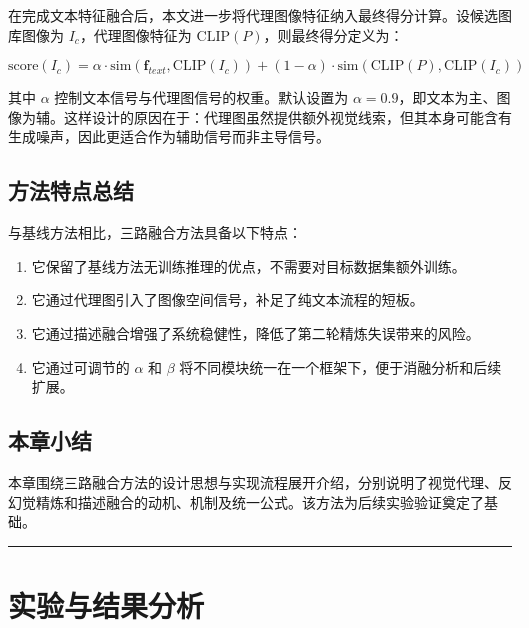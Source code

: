 \documentclass[12pt,a4paper,UTF8,oneside,openany]{ctexrep}
\providecommand{\tightlist}{%
  \setlength{\itemsep}{0pt}\setlength{\parskip}{0pt}}
\begin{document}
在完成文本特征融合后，本文进一步将代理图像特征纳入最终得分计算。设候选图库图像为
\(I_c\)，代理图像特征为 \(\text{CLIP}(P)\)，则最终得分定义为：

\[
\text{score}(I_c)=\alpha \cdot \text{sim}\left(\mathbf{f}_{text},\text{CLIP}(I_c)\right)+(1-\alpha)\cdot \text{sim}\left(\text{CLIP}(P),\text{CLIP}(I_c)\right)
\]

其中 \(\alpha\) 控制文本信号与代理图信号的权重。默认设置为
\(\alpha=0.9\)，即文本为主、图像为辅。这样设计的原因在于：代理图虽然提供额外视觉线索，但其本身可能含有生成噪声，因此更适合作为辅助信号而非主导信号。

\hypertarget{ux65b9ux6cd5ux7279ux70b9ux603bux7ed3}{%
\subsection{方法特点总结}\label{ux65b9ux6cd5ux7279ux70b9ux603bux7ed3}}

与基线方法相比，三路融合方法具备以下特点：

\begin{enumerate}
\def\labelenumi{\arabic{enumi}.}
\tightlist
\item
  它保留了基线方法无训练推理的优点，不需要对目标数据集额外训练。
\item
  它通过代理图引入了图像空间信号，补足了纯文本流程的短板。
\item
  它通过描述融合增强了系统稳健性，降低了第二轮精炼失误带来的风险。
\item
  它通过可调节的 \(\alpha\) 和 \(\beta\)
  将不同模块统一在一个框架下，便于消融分析和后续扩展。
\end{enumerate}

\hypertarget{ux672cux7ae0ux5c0fux7ed3-1}{%
\subsection{本章小结}\label{ux672cux7ae0ux5c0fux7ed3-1}}

本章围绕三路融合方法的设计思想与实现流程展开介绍，分别说明了视觉代理、反幻觉精炼和描述融合的动机、机制及统一公式。该方法为后续实验验证奠定了基础。

\begin{center}\rule{0.5\linewidth}{0.5pt}\end{center}

\hypertarget{ux5b9eux9a8cux4e0eux7ed3ux679cux5206ux6790}{%
\section{实验与结果分析}\label{ux5b9eux9a8cux4e0eux7ed3ux679cux5206ux6790}}
\end{document}
